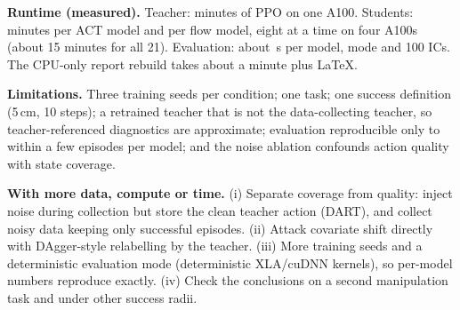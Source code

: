 \documentclass[11pt]{article}
\begin{document}
\textbf{Runtime (measured).} Teacher: \teacherWallMin{} minutes of PPO on one
A100. Students: \trainMinAct{} minutes per ACT model and \trainMinFlow{} per flow
model, eight at a time on four A100s (about 15 minutes for all 21). Evaluation:
about \evalSecMean{}\,s per model, mode and 100 ICs. The CPU-only report rebuild
takes about a minute plus LaTeX.

\textbf{Limitations.} Three training seeds per condition; one task; one success
definition (5\,cm, 10 steps); a retrained teacher that is not the
data-collecting teacher, so teacher-referenced diagnostics are approximate;
evaluation reproducible only to within a few episodes per model; and the noise
ablation confounds action quality with state coverage.

\textbf{With more data, compute or time.} (i) Separate coverage from quality:
inject noise during collection but store the clean teacher action (DART), and
collect noisy data keeping only successful episodes. (ii) Attack covariate shift
directly with DAgger-style relabelling by the teacher. (iii) More training seeds
and a deterministic evaluation mode (deterministic XLA/cuDNN kernels), so
per-model numbers reproduce exactly. (iv) Check the conclusions on a second
manipulation task and under other success radii.


\end{document}
